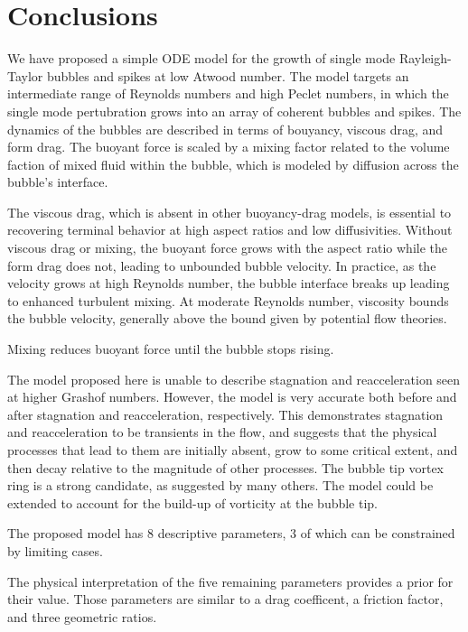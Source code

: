 \section{Conclusions}

We have proposed a simple ODE model for the growth of single mode Rayleigh-Taylor bubbles and spikes at low Atwood number.
The model targets an intermediate range of Reynolds numbers and high Peclet numbers, in which the single mode pertubration grows into an array of coherent bubbles and spikes.
The dynamics of the bubbles are described in terms of bouyancy, viscous drag, and form drag.
The buoyant force is scaled by a mixing factor related to the volume faction of mixed fluid within the bubble, which is modeled by diffusion across the bubble's interface.

The viscous drag, which is absent in other buoyancy-drag models, is essential to recovering terminal behavior at high aspect ratios and low diffusivities.  
Without viscous drag or mixing, the buoyant force grows with the aspect ratio while the form drag does not, leading to unbounded bubble velocity.
In practice, as the velocity grows at high Reynolds number, the bubble interface breaks up leading to enhanced turbulent mixing.
At moderate Reynolds number, viscosity bounds the bubble velocity, generally above the bound given by potential flow theories.

Mixing reduces buoyant force until the bubble stops rising.

The model proposed here is unable to describe stagnation and reacceleration seen at higher Grashof numbers.
However, the model is very accurate both before and after stagnation and reacceleration, respectively.
This demonstrates stagnation and reacceleration to be transients in the flow, and suggests that the physical processes that lead to them are initially absent, grow to some critical extent, and then decay relative to the magnitude of other processes.
The bubble tip vortex ring is a strong candidate, as suggested by many others.
The model could be extended to account for the build-up of vorticity at the bubble tip.

The proposed model has 8 descriptive parameters, 3 of which can be constrained by limiting cases.

The physical interpretation of the five remaining parameters provides a prior for their value.
Those parameters are similar to a drag coefficent, a friction factor, and three geometric ratios.


